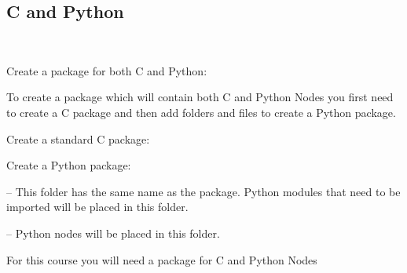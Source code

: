 \documentclass[usenames,11,dvipsnames,svgnames,x11names,aspectratio=1610,bibref]{beamer}
\newcommand{\sectionColor}[1]{\textcolor{sectionchevron}{#1}}
\newcommand{\mydisclaimer}{{\color{disclaimer}{\scriptsize ROS 2 -- Part I}}}
\newcommand\secsec{\cnordSix{\secname}~\sectionColor{\small\faChevronRight}~{\cnordFive{\small\subsecname}\hfill\mydisclaimer~}}
\def\CC{{C\nolinebreak[4]\hspace{-.05em}\raisebox{.4ex}{\tiny\bf ++}}\xspace}
\newcommand{\mytodo}{\textcolor{iconColor}{\faTasks}\xspace}
\newcommand{\myreminder}{\textcolor{iconColor}{\faBell}\xspace}
\begin{document}
\subsection{\CC and Python}
\begin{frame}[fragile]{\secsec}
\vspace*{\fill}
\begin{center} 


{\mytodo Create a package for both \CC and  Python:~ } 

\hrulefill

\begin{compactitem}
    \footnotesize
    \item To create a package which will contain both \CC and Python Nodes you first need to create a \CC package and then add folders and files to create a Python package.
\end{compactitem}
\begin{compactenum}
    \footnotesize
    \item Create a standard \CC package:
    \item[] 
    \item Create a Python package:
    \item[] 
    \item[]  -- This folder has the same name as the package. Python modules that need to be imported will be placed in this folder.
    \item[]  
    \item[]  -- Python nodes will be placed in this folder.
\end{compactenum}

\hrulefill

{\normalsize \myreminder For this course you will need a package for \CC and Python Nodes}
\end{center}
\vspace*{\fill}
\end{frame}
\end{document}

